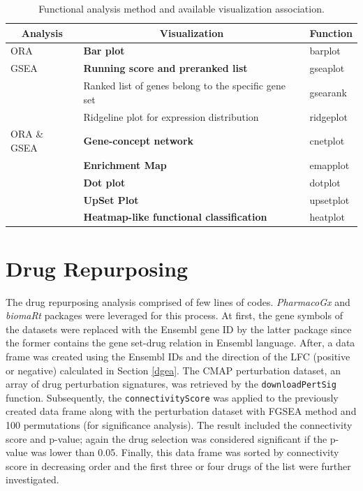 \begin{table}[ht]
\centering
\caption{Functional analysis method and available visualization association.}
\label{tab:plots}
\begin{tabular}{lll}
\hline
\multicolumn{1}{c}{\textbf{Analysis}} & \multicolumn{1}{c}{\textbf{Visualization}} & \multicolumn{1}{c}{\textbf{Function}} \\ \hline
ORA         & \textbf{Bar plot}                                    & barplot   \\
GSEA        & \textbf{Running score and preranked list}            & gseaplot  \\
            & Ranked list of genes belong to the specific gene set & gsearank  \\
            & Ridgeline plot for expression distribution           & ridgeplot \\
ORA \& GSEA & \textbf{Gene-concept network}                        & cnetplot  \\
            & \textbf{Enrichment Map}                              & emapplot  \\
            & \textbf{Dot plot}                                    & dotplot   \\
            & \textbf{UpSet Plot}                                  & upsetplot \\
            & \textbf{Heatmap-like functional classification}      & heatplot  \\ \hline
\end{tabular}
\end{table}

\section{Drug Repurposing} \label{drug-method}

The drug repurposing analysis comprised of few lines of codes. \textit{PharmacoGx} and \textit{biomaRt} packages were leveraged for this process. At first, the gene symbols of the datasets were replaced with the Ensembl gene ID by the latter package since the former contains the gene set-drug relation in Ensembl language. After, a data frame was created using the Ensembl IDs and the direction of the LFC (positive or negative) calculated in Section \ref{dgea}. The CMAP perturbation dataset, an array of drug perturbation signatures, was retrieved by the \verb|downloadPertSig| function. Subsequently, the \verb|connectivityScore| was applied to the previously created data frame along with the perturbation dataset with FGSEA method and 100 permutations (for significance analysis). The result included the connectivity score and p-value; again the drug selection was considered significant if the p-value was lower than 0.05. Finally, this data frame was sorted by connectivity score in decreasing order and the first three or four drugs of the list were further investigated.

